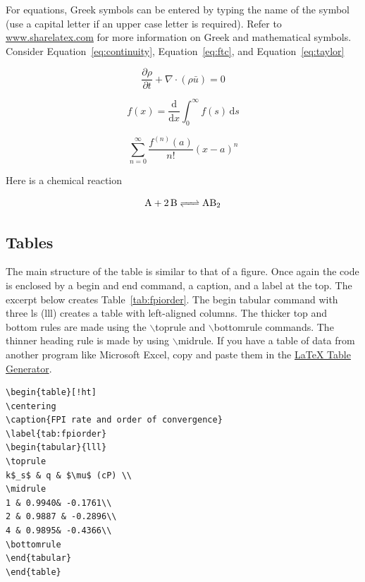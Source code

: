 \documentclass[a4paper,12pt]{article}
\begin{document}
For equations, Greek symbols can be entered by typing the name of the symbol (use a capital letter if an upper case letter is required). Refer to \href{https://www.sharelatex.com/learn/List_of_Greek_letters_and_math_symbols}{www.sharelatex.com} for more information on Greek and mathematical symbols. Consider Equation~\ref{eq:continuity}, Equation~\ref{eq:ftc}, and Equation~\ref{eq:taylor}

\begin{equation}
\label{eq:continuity}
\frac{\partial \rho}{\partial t} + \nabla \cdot (\rho \bar{u}) = 0
\end{equation}

\begin{equation}
\label{eq:ftc}
f(x) = \frac{\mathrm{d}}{\mathrm{d}x} \int^\infty_0  f(s) \, \mathrm{d}s
\end{equation}

\begin{equation}
\label{eq:taylor}
\sum^\infty_{n=0} \frac{f^{(n)}(a)}{n!} (x-a)^n
\end{equation}

Here is a chemical reaction

\begin{displaymath}
  \ce{A + 2B <=> AB2}
\end{displaymath}

\subsection{Tables}
The main structure of the table is similar to that of a figure. Once again the code is enclosed by a begin and end command, a caption, and a label at the top. The excerpt below creates Table~\ref{tab:fpiorder}. The begin tabular command with three ls (lll) creates a table with left-aligned columns. The thicker top and bottom rules are made using the $\backslash$toprule and $\backslash$bottomrule commands. The thinner heading rule is made by using $\backslash$midrule. If you have a table of data from another program like Microsoft Excel, copy and paste them in the \href{https://www.tablesgenerator.com/}{\LaTeX{} Table Generator}.

\begin{lstlisting}
\begin{table}[!ht]
\centering
\caption{FPI rate and order of convergence}
\label{tab:fpiorder}
\begin{tabular}{lll}
\toprule
k$_s$ & q & $\mu$ (cP) \\
\midrule
1 & 0.9940& -0.1761\\
2 & 0.9887 & -0.2896\\
4 & 0.9895& -0.4366\\
\bottomrule
\end{tabular}
\end{table}
\end{lstlisting}
\end{document}
